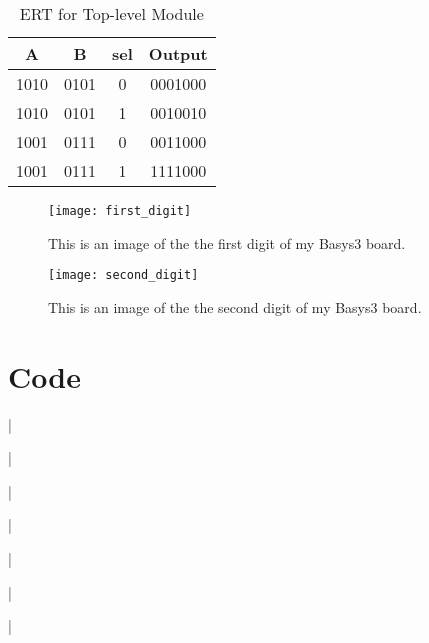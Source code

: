 \documentclass[11pt]{article}
\newcommand{\Verilog}[2][]{%
	
}
\begin{document}
\begin{table}[ht]\centering
	\caption{ERT for Top-level Module}
	\label{tbl:example_table}
	\begin{tabular}{ccc|c}
		\toprule
		 A & B & sel & Output \\
		\midrule
		1010 & 0101 & 0 & 0001000 \\
		1010 & 0101 & 1 & 0010010 \\
		1001 & 0111 & 0 & 0011000 \\
		1001 & 0111 & 1 & 1111000 \\
		\bottomrule
	\end{tabular} 
\end{table}

\begin{figure}[ht]\centering
\texttt{[image: first\_digit]}
\caption{This is an image of the the first digit of my Basys3 board.}
\label{fig:original_logo}
\end{figure}
\begin{figure}[ht]\centering
\texttt{[image: second\_digit]}
\caption{This is an image of the the second digit of my Basys3 board.}
\label{fig:original_logo}
\end{figure}
 \FloatBarrier
\section*{Code}

\Verilog[firstline=22, lastline=31, caption=MUX Verilog code]{Lab06_project/codedirectory/mux2_4b.sv}|

\Verilog[firstline=22, lastline=45, caption=MUX Test Verilog code]{Lab06_project/codedirectory/mux2_4b_test.sv}|

\Verilog[firstline=22, lastline=51, caption=Seven-segment Decoder Verilog code]{Lab06_project/codedirectory/sseg_decoder.sv}|

\Verilog[firstline=22, lastline=42, caption=Seven-segment Decoder Test Verilog code]{Lab06_project/codedirectory/sseg_decoder_test.sv}|

\Verilog[firstline=22, lastline=43, caption=Seven-segment Wrapper Verilog code]{Lab06_project/codedirectory/sseg1_wrapper.sv}|

\Verilog[firstline=22, lastline=53, caption=Seven-segment 1 Verilog code]{Lab06_project/codedirectory/sseg1.sv}|

\Verilog[firstline=22, lastline=57, caption=Seven-segment 1 Test Verilog code]{Lab06_project/codedirectory/sseg1_test.sv}|
\end{document}
